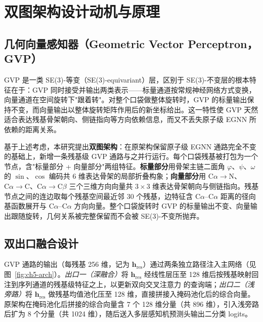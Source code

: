 \section{双图架构设计动机与原理}
\label{sec:ch5-design}

\subsection{几何向量感知器（Geometric Vector Perceptron，GVP）}
\label{subsec:ch5-gvp}

GVP\cite{GVP2021} 是一类 SE(3)-等变（SE(3)-equivariant）层，区别于 SE(3)-不变层的根本特征在于：GVP 同时接受并输出两类表示——标量通道按常规神经网络方式变换，向量通道在空间旋转下"跟着转"。对整个口袋做整体旋转时，GVP 的标量输出保持不变，而向量输出以整体旋转矩阵作用后的新坐标给出。这一特性使 GVP 天然适合表达残基骨架朝向、侧链指向等方向依赖信息，而又不丢失原子级 EGNN 所依赖的距离关系。

基于上述考虑，本研究提出\textbf{双图架构}：在原架构保留原子级 EGNN 通路完全不变的基础上，新增一条残基级 GVP 通路与之并行运行。每个口袋残基被打包为一个节点，含"标量部分 + 向量部分"两组特征。\textbf{标量部分}用骨架主链二面角 $\varphi$、$\psi$、$\omega$ 的 $\sin$、$\cos$ 编码共 $6$ 维表达骨架的局部折叠构象；\textbf{向量部分}用 $\mathrm{C}\alpha \to \mathrm{N}$、$\mathrm{C}\alpha \to \mathrm{C}$、$\mathrm{C}\alpha \to \mathrm{C}\beta$ 三个三维方向向量共 $3 \times 3$ 维表达骨架朝向与侧链指向。残基节点之间的连边取每个残基空间最近邻 30 个残基，边特征含 $\mathrm{C}\alpha$--$\mathrm{C}\alpha$ 距离的径向基函数展开与 $\mathrm{C}\alpha$--$\mathrm{C}\alpha$ 方向向量。整个口袋旋转时 GVP 的标量输出不变、向量输出跟随旋转，几何关系被完整保留而不会被 SE(3)-不变所抛弃。

\subsection{双出口融合设计}
\label{subsec:ch5-fusion}

GVP 通路的输出（每残基 256 维，记为 $\mathbf{h}_{\mathrm{res}}$）通过两条独立路径注入主网络（见图~\ref{fig:ch5-arch}）。\emph{出口一（深融合）}将 $\mathbf{h}_{\mathrm{res}}$ 经线性层压至 128 维后按残基映射回注到序列通道的残基级特征之上，以更新双向交叉注意力\cite{Transformer2017} 的查询端；\emph{出口二（浅旁路）}将 $\mathbf{h}_{\mathrm{res}}$ 做残基均值池化压至 128 维，直接拼接入掩码池化后的综合向量。原架构在掩码池化后拼接的综合向量含 7 个 128 维分量（共 896 维），引入浅旁路后扩为 8 个分量（共 1024 维），随后送入多层感知机预测头输出二分类 logits。

